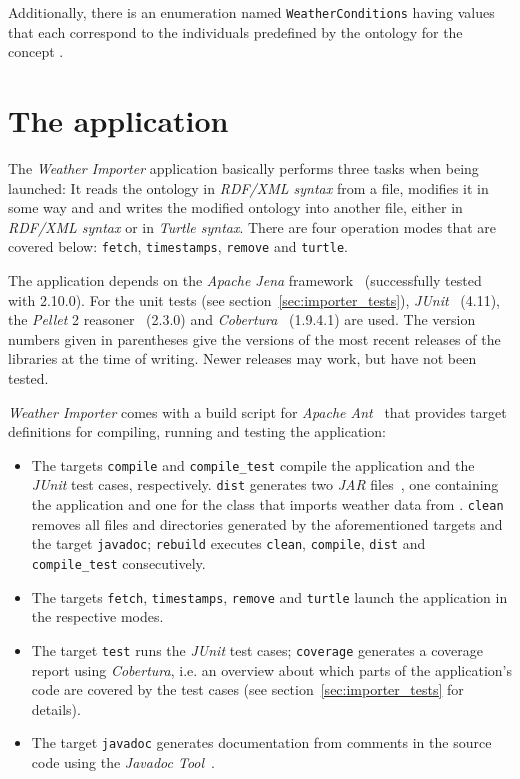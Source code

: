 Additionally, there is an enumeration named \texttt{WeatherConditions} having values that each correspond to the individuals predefined by the ontology for the concept .

\section{The application}
\label{sec:importer_application}

The \emph{Weather Importer} application basically performs three tasks when being launched: It reads the \smarthomeweather ontology in \emph{RDF/XML syntax}\cite{RDF_XML} from a file, modifies it in some way and and writes the modified ontology into another file, either in \emph{RDF/XML syntax} or in \emph{Turtle syntax}\cite{Turtle}. There are four operation modes that are covered below: \texttt{fetch}, \texttt{timestamps}, \texttt{remove} and \texttt{turtle}.

The application depends on the \emph{Apache Jena} framework~\cite{apache_jena} (successfully tested with 2.10.0). For the unit tests (see section~\ref{sec:importer_tests}), \emph{JUnit}~\cite{junit} (4.11), the \emph{Pellet}  2 reasoner~\cite{pellet} (2.3.0) and \emph{Cobertura}~\cite{cobertura} (1.9.4.1) are used. The version numbers given in parentheses give the versions of the most recent releases of the libraries at the time of writing. Newer releases may work, but have not been tested.

\emph{Weather Importer} comes with a build script for \emph{Apache Ant}~\cite{apache_ant} that provides target definitions for compiling, running and testing the application:

\begin{itemize}
  \item The targets \texttt{compile} and \texttt{compile\_test} compile the application and the \emph{JUnit} test cases, respectively. \texttt{dist} generates two \emph{JAR} files~\cite{jar}, one containing the application and one for the class that imports weather data from \yrno. \texttt{clean} removes all files and directories generated by the aforementioned targets and the target \texttt{javadoc}; \texttt{rebuild} executes \texttt{clean}, \texttt{compile}, \texttt{dist} and \texttt{compile\_test} consecutively.
  \item The targets \texttt{fetch}, \texttt{timestamps}, \texttt{remove} and \texttt{turtle} launch the application in the respective modes.
  \item The target \texttt{test} runs the \emph{JUnit} test cases; \texttt{coverage} generates a coverage report using \emph{Cobertura}, i.e. an overview about which parts of the application's code are covered by the test cases (see section~\ref{sec:importer_tests} for details).
  \item The target \texttt{javadoc} generates documentation from comments in the source code using the \emph{Javadoc Tool}~\cite{javadoc}.
\end{itemize}

